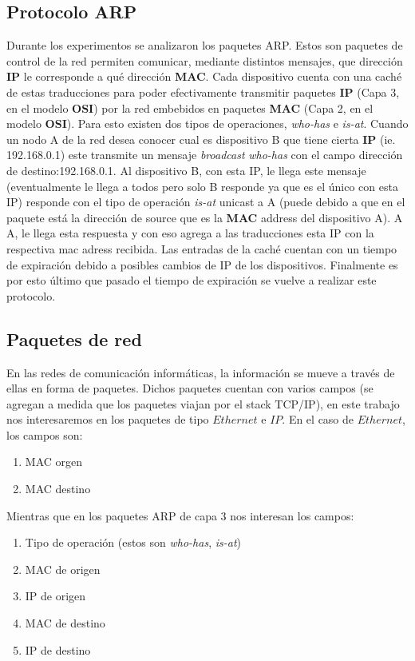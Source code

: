 \subsection{Protocolo ARP}
Durante los experimentos se analizaron los paquetes ARP. Estos son paquetes
de control de la red permiten comunicar, mediante distintos mensajes,
que dirección \textbf{IP} le corresponde a qué dirección \textbf{MAC}. Cada dispositivo
cuenta con una caché de estas traducciones para poder efectivamente
transmitir paquetes \textbf{IP} (Capa 3, en el modelo \textbf{OSI}) por la red embebidos
en paquetes \textbf{MAC} (Capa 2, en el modelo \textbf{OSI}). Para esto existen
dos tipos de operaciones, \textit{who-has} e \textit{is-at}. Cuando un nodo A
de la red desea conocer cual es dispositivo B que tiene cierta \textbf{IP} (ie. 192.168.0.1)
este transmite un mensaje \textit{broadcast} \textit{who-has} con el campo dirección de destino:192.168.0.1.
Al dispositivo B, con esta IP, le llega este mensaje (eventualmente le llega a todos pero solo B responde ya que es el único con esta IP)
responde con el tipo de operación \textit{is-at} unicast a A (puede debido a que en el paquete está la dirección de source
que es la \textbf{MAC} address del dispositivo A). A A, le llega esta respuesta y con eso agrega a las traducciones esta IP con la respectiva mac adress
recibida. Las entradas de la caché cuentan con un tiempo de expiración debido a posibles cambios de IP de los dispositivos. Finalmente
es por esto último que pasado el tiempo de expiración se vuelve a realizar este protocolo.

\subsection{Paquetes de red}

En las redes de comunicación informáticas, la información se mueve a través de ellas en forma de paquetes. Dichos paquetes cuentan con varios campos (se agregan a medida que los paquetes viajan por el stack TCP/IP), en este trabajo nos interesaremos en los paquetes de tipo $Ethernet$ e $IP$. En el caso de $Ethernet$, los campos son:

\begin{enumerate}
	\item MAC orgen
	\item MAC destino
\end{enumerate}

Mientras que en los paquetes ARP de capa 3 nos interesan los campos:

\begin{enumerate}
	\item Tipo de operación (estos son \emph{who-has}, \emph{is-at})
	\item MAC de origen
	\item IP de origen
	\item MAC de destino
	\item IP de destino
\end{enumerate}
